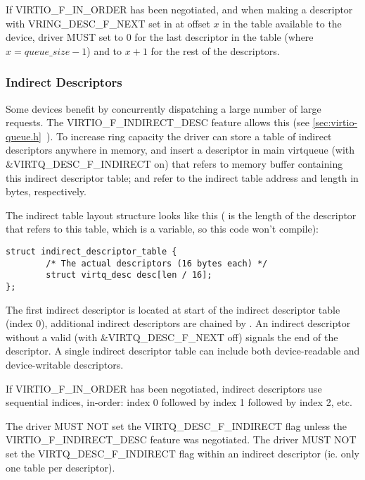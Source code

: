 If VIRTIO_F_IN_ORDER has been negotiated, and when making a
descriptor with VRING_DESC_F_NEXT set in  at offset
$x$ in the table available to the device, driver MUST set
 to $0$ for the last descriptor in the table
(where $x = queue\_size - 1$) and to $x + 1$ for the rest of the descriptors.

\subsubsection{Indirect Descriptors}\label{sec:Basic Facilities of a Virtio Device / Virtqueues / The Virtqueue Descriptor Table / Indirect Descriptors}

Some devices benefit by concurrently dispatching a large number
of large requests. The VIRTIO_F_INDIRECT_DESC feature allows this (see \ref{sec:virtio-queue.h}~). To increase
ring capacity the driver can store a table of indirect
descriptors anywhere in memory, and insert a descriptor in main
virtqueue (with \&VIRTQ_DESC_F_INDIRECT on) that refers to memory buffer
containing this indirect descriptor table;  and 
refer to the indirect table address and length in bytes,
respectively.

The indirect table layout structure looks like this
( is the length of the descriptor that refers to this table,
which is a variable, so this code won't compile):

\begin{lstlisting}
struct indirect_descriptor_table {
        /* The actual descriptors (16 bytes each) */
        struct virtq_desc desc[len / 16];
};
\end{lstlisting}

The first indirect descriptor is located at start of the indirect
descriptor table (index 0), additional indirect descriptors are
chained by . An indirect descriptor without a valid 
(with \&VIRTQ_DESC_F_NEXT off) signals the end of the descriptor.
A single indirect descriptor
table can include both device-readable and device-writable descriptors.

If VIRTIO_F_IN_ORDER has been negotiated, indirect descriptors
use sequential indices, in-order: index 0 followed by index 1
followed by index 2, etc.

The driver MUST NOT set the VIRTQ_DESC_F_INDIRECT flag unless the
VIRTIO_F_INDIRECT_DESC feature was negotiated.   The driver MUST NOT
set the VIRTQ_DESC_F_INDIRECT flag within an indirect descriptor (ie. only
one table per descriptor).


